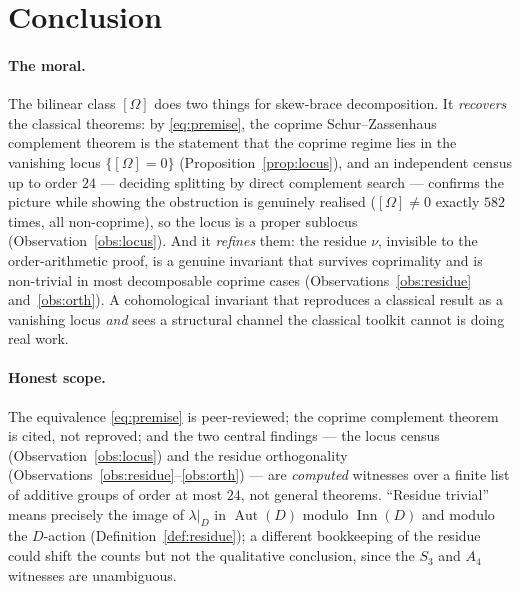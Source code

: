 \documentclass[11pt]{article}
\theoremstyle{definition}
\newcommand{\Aut}{\operatorname{Aut}}
\newcommand{\Inn}{\operatorname{Inn}}
\begin{document}
\section{Conclusion}\label{sec:conclusion}

\paragraph{The moral.}
The bilinear class $[\Omega]$ does two things for skew-brace decomposition. It \emph{recovers}
the classical theorems: by \eqref{eq:premise}, the coprime Schur--Zassenhaus complement
theorem is the statement that the coprime regime lies in the vanishing locus
$\{[\Omega]=0\}$ (Proposition~\ref{prop:locus}), and an independent census up to order $24$ ---
deciding splitting by direct complement search --- confirms the picture while showing the
obstruction is genuinely realised ($[\Omega]\ne0$ exactly $582$ times, all non-coprime), so
the locus is a proper sublocus (Observation~\ref{obs:locus}). And it \emph{refines} them: the residue $\nu$, invisible to
the order-arithmetic proof, is a genuine invariant that survives coprimality and is
non-trivial in most decomposable coprime cases (Observations~\ref{obs:residue}
and~\ref{obs:orth}). A cohomological invariant that reproduces a classical result as a
vanishing locus \emph{and} sees a structural channel the classical toolkit cannot is doing
real work.

\paragraph{Honest scope.}
The equivalence \eqref{eq:premise} is peer-reviewed; the coprime complement theorem is cited,
not reproved; and the two central findings --- the locus census
(Observation~\ref{obs:locus}) and the residue orthogonality
(Observations~\ref{obs:residue}--\ref{obs:orth}) --- are \emph{computed} witnesses over a
finite list of additive groups of order at most $24$, not general theorems. ``Residue
trivial'' means precisely the image of $\lambda|_D$ in $\Aut(D)$ modulo $\Inn(D)$ and modulo
the $D$-action (Definition~\ref{def:residue}); a different bookkeeping of the residue could
shift the counts but not the qualitative conclusion, since the $S_3$ and $A_4$ witnesses are
unambiguous.
\end{document}
